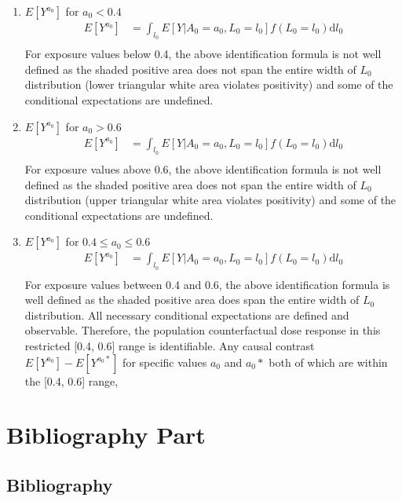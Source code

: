 \documentclass[dvipdfmx,10pt]{article}
\begin{document}
\begin{enumerate}
\item \(E[Y^{a_{0}}]\) for \(a_{0} < 0.4\)
\label{sec:org5b49ac2}
\begin{align*}
  E[Y^{a_{0}}]
  &= \int_{l_{0}} E[Y | A_{0} = a_{0}, L_{0} = l_{0}] f(L_{0} = l_{0}) \text{d}l_{0}\\
\end{align*}
For exposure values below 0.4, the above identification formula is not well defined as the shaded positive area does not span the entire width of \(L_{0}\) distribution (lower triangular white area violates positivity) and some of the conditional expectations are undefined.

\item \(E[Y^{a_{0}}]\) for \(a_{0} > 0.6\)
\label{sec:orgae85ec4}
\begin{align*}
  E[Y^{a_{0}}]
  &= \int_{l_{0}} E[Y | A_{0} = a_{0}, L_{0} = l_{0}] f(L_{0} = l_{0}) \text{d}l_{0}\\
\end{align*}
For exposure values above 0.6, the above identification formula is not well defined as the shaded positive area does not span the entire width of \(L_{0}\) distribution (upper triangular white area violates positivity) and some of the conditional expectations are undefined.

\item \(E[Y^{a_{0}}]\) for \(0.4 \le a_{0} \le 0.6\)
\label{sec:org7956896}
\begin{align*}
  E[Y^{a_{0}}]
  &= \int_{l_{0}} E[Y | A_{0} = a_{0}, L_{0} = l_{0}] f(L_{0} = l_{0}) \text{d}l_{0}\\
\end{align*}
For exposure values between 0.4 and 0.6, the above identification formula is well defined as the shaded positive area does span the entire width of \(L_{0}\) distribution. All necessary conditional expectations are defined and observable. Therefore, the population counterfactual dose response in this restricted [0.4, 0.6] range is identifiable. Any causal contrast \(E[Y^{a_{0}}] - E[Y^{a_{0}*}]\) for specific values \(a_{0}\) and \(a_{0}*\) both of which are within the [0.4, 0.6] range,
\end{enumerate}


\section{Bibliography Part}
\label{sec:org51bbf0a}
\subsection{Bibliography}
\label{sec:org2efcddc}
\renewcommand{\section}[2]{}



\end{document}
